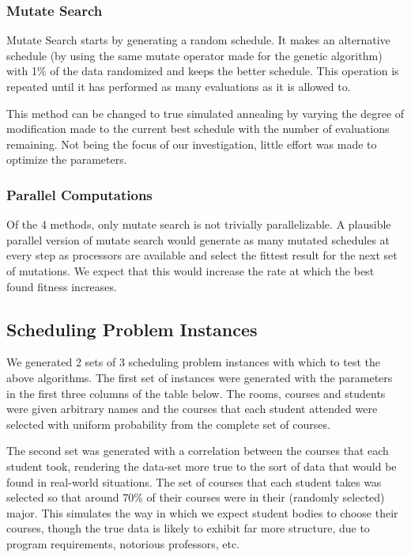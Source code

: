 \documentclass[letterpaper]{article}
\begin{document}
    \subsubsection{Mutate Search}
      Mutate Search starts by generating a random schedule. It makes an alternative schedule
      (by using the same mutate operator made for the genetic algorithm) with 1\% of the
      data randomized and keeps the better schedule. This operation is
      repeated until it has performed as many evaluations as it is allowed to.
      
      This method can be changed to true simulated annealing by varying the degree of
      modification made to the current best schedule with the number of evaluations
      remaining. Not being the focus of our investigation, little effort was made to 
      optimize the parameters. 
      
    \subsubsection{Parallel Computations}
      Of the 4 methods, only mutate search is not trivially parallelizable. A plausible 
      parallel version of mutate search would generate as many mutated schedules at 
      every step as processors are available and select the fittest result for the next 
      set of mutations. We expect that this would increase the rate at which the best 
      found fitness increases.
      
  \subsection{Scheduling Problem Instances}
    We generated 2 sets of 3 scheduling problem instances with which to test the 
    above algorithms. The first set of instances were generated with the parameters 
    in the first three columns of the table below. The rooms, courses and students 
    were given arbitrary names and the courses that each student attended were 
    selected with uniform probability from the complete set of courses.
      
    The second set was generated with a correlation between the courses that each 
    student took, rendering the data-set more true to the sort of data that would 
    be found in real-world situations. The set of courses that each student takes 
    was selected so that around 70\% of their courses were in their (randomly selected) 
    major. This simulates the way in which we expect student bodies to choose their 
    courses, though the true data is likely to exhibit far more structure, due to 
    program requirements, notorious professors, etc.
    
\end{document}
